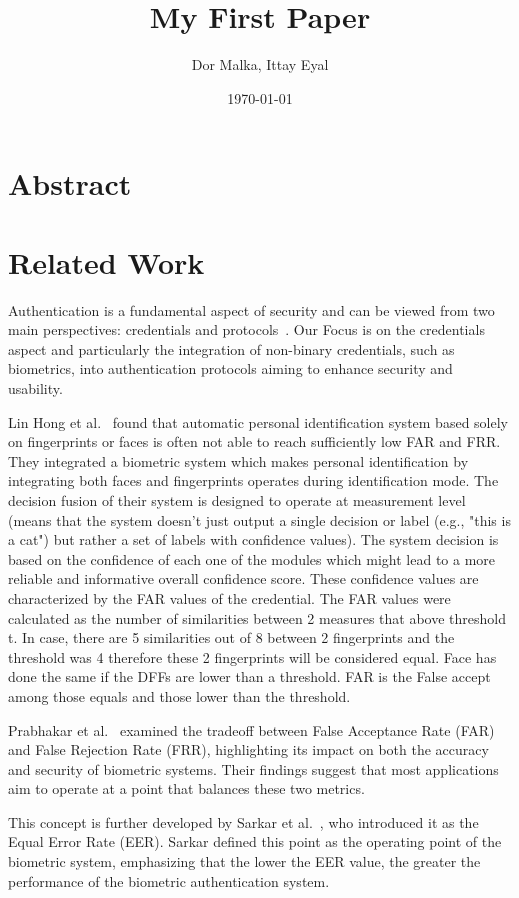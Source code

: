 \documentclass{article}
\title{My First Paper}
\author{Dor Malka, Ittay Eyal}
\date{\today}
\begin{document}
\maketitle

\section{Abstract}
\section{Related Work}
Authentication is a fundamental aspect of security and can be viewed from two main perspectives: credentials and protocols~\cite{mouallem2024}.
Our Focus is on the credentials aspect and particularly the integration of non-binary credentials, such as biometrics, into authentication protocols aiming to enhance security and usability.

Lin Hong et al.~\cite{hong1998} found that automatic personal identification system based solely on fingerprints or faces is often not able to reach sufficiently low FAR and FRR. They integrated a biometric system which makes personal identification by integrating both faces and fingerprints operates during identification mode. The decision fusion of their system is designed to operate at measurement level (means that the system doesn't just output a single decision or label (e.g., "this is a cat") but rather a set of labels with confidence values). The system decision is based on the confidence of each one of the modules which might lead to a more reliable and informative overall confidence score.
These confidence values are characterized by the FAR values of the credential. The FAR values were calculated as the number of similarities between 2 measures that above threshold t. In case, there are 5 similarities out of 8 between 2 fingerprints and the threshold was 4 therefore these 2 fingerprints will be considered equal. Face has done the same if the DFFs are lower than a threshold. FAR is the False accept among those equals and those lower than the threshold.


Prabhakar et al.~\cite{prabhakar2003} examined the tradeoff between False Acceptance Rate (FAR) and False Rejection Rate (FRR), highlighting its impact on both the accuracy and security of biometric systems. Their findings suggest that most applications aim to operate at a point that balances these two metrics.

This concept is further developed by Sarkar et al.~\cite{sarkar2020}, who introduced it as the Equal Error Rate (EER). Sarkar defined this point as the operating point of the biometric system, emphasizing that the lower the EER value, the greater the performance of the biometric authentication system.
\end{document}

